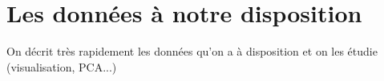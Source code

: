 \section{Les données à notre disposition}

On décrit très rapidement les données qu'on a à disposition et on les étudie (visualisation, PCA...)
